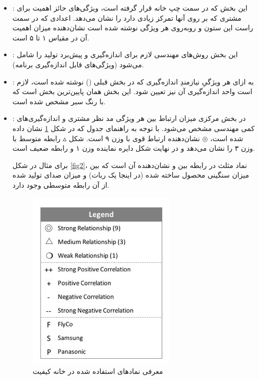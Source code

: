 {\begin{enumerate}[a)]
\begin{itemize}
\item
{}: این بخش که در سمت چپ خانه قرار گرفته است، ویژگی‌های حائز اهمیت برای مشتری که بر روی آنها تمرکز زیادی دارد را نشان می‌دهد. اعدادی که در سمت راست این ستون و روبه‌روی هر ویژگی‌ نوشته شده است نشان‌دهنده میزان اهمیت آن در مقیاس ۱ تا ۵ است.

\item
{}: این بخش روش‌های مهندسی لازم برای اندازه‌گیری و پیش‌برد تولید را شامل می‌شود (ویژگی‌های قابل اندازه‌گیری برنامه). 

\item
{}: به ازای هر ویژگیِ نیازمندِ اندازه‌گیری که در بخش قبلی () نوشته شده است، لازم است واحد اندازه‌گیری آن نیز تعیین شود. این بخش همان پایین‌ترین بخش است که با رنگ سبر مشخص شده است.

\item
{}: در بخش مرکزی میزان ارتباط بین هر ویژگی مد نظر مشتری و اندازه‌گیری‌های کمی مهندسی مشخص می‌شود. با توجه به راهنمای جدول که در شکل \ref{fig3} نشان داده شده است، $\circledcirc$ نشان‌دهنده ارتباط قوی با وزن ۹ است. شکل $\vartriangle$ رابطه متوسط با وزن ۳ را نشان می‌دهد و در نهایت شکل دایره نماینده وزن ۱ و رابطه ضعیف است.

برای مثال در شکل \ref{fig2}، نماد مثلث در رابطه بین  و  نشان‌دهنده آن است که بین میزان سنگینی محصول ساخته شده (در اینجا یک ربات) و میزان صدای تولید شده از آن رابطه متوسطی وجود دارد. 

\begin{figure}[h]
	\centering
	\includegraphics[scale=0.8]{figs/2-2}
	\caption{معرفی نمادهای استفاده شده در خانه کیفیت}
	\label{fig3}
\end{figure}


\end{itemize}
\end{enumerate}}
